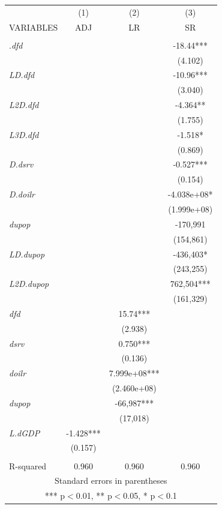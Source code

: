 \documentclass[12pt,a4 paper,title page]{article}
\begin{document}
\begin{tabular}{lccc} \hline
 & (1) & (2) & (3) \\
VARIABLES & ADJ & LR & SR \\ \hline
 &  &  &  \\
.\textit{dfd} &  &  & -18.44*** \\
 &  &  & (4.102) \\
\textit{LD.dfd} &  &  & -10.96*** \\
 &  &  & (3.040) \\
\textit{L2D.dfd} &  &  & -4.364** \\
 &  &  & (1.755) \\
\textit{L3D.dfd}&  &  & -1.518* \\
 &  &  & (0.869) \\
\textit{D.dsrv} &  &  & -0.527*** \\
 &  &  & (0.154) \\
\textit{D.doilr} &  &  & -4.038e+08* \\
 &  &  & (1.999e+08) \\
\textit{dupop} &  &  & -170,991 \\
 &  &  & (154,861) \\
\textit{LD.dupop} &  &  & -436,403* \\
 &  &  & (243,255) \\
\textit{L2D.dupop} &  &  & 762,504*** \\
 &  &  & (161,329) \\
\textit{dfd} &  & 15.74*** &  \\
 &  & (2.938) &  \\
\textit{dsrv} &  & 0.750*** &  \\
 &  & (0.136) &  \\
\textit{doilr} &  & 7.999e+08*** &  \\
 &  & (2.460e+08) &  \\
\textit{dupop} &  & -66,987*** &  \\
 &  & (17,018) &  \\
\textit{L.dGDP} & -1.428*** &  &  \\
 & (0.157) &  &  \\
 &  &  &  \\
 R-squared & 0.960 & 0.960 & 0.960 \\ \hline
\multicolumn{4}{c}{ Standard errors in parentheses} \\
\multicolumn{4}{c}{ *** p$<$0.01, ** p$<$0.05, * p$<$0.1} \\
\end{tabular}
\end{document}
